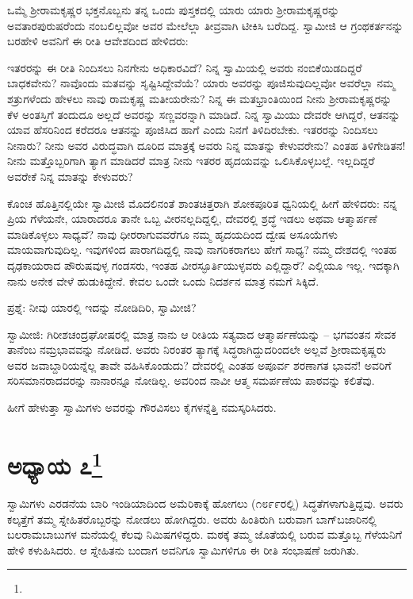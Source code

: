 ಒಮ್ಮೆ ಶ‍್ರೀರಾಮಕೃಷ್ಣರ ಭಕ್ತನೊಬ್ಬನು ತನ್ನ ಒಂದು ಪುಸ್ತಕದಲ್ಲಿ ಯಾರು ಯಾರು ಶ‍್ರೀರಾಮಕೃಷ್ಣರನ್ನು ಅವತಾರಪುರುಷರೆಂದು ನಂಬಲಿಲ್ಲವೋ ಅವರ ಮೇಲೆಲ್ಲಾ ತೀವ್ರವಾಗಿ ಟೀಕಿಸಿ ಬರೆದಿದ್ದ. ಸ್ವಾಮೀಜಿ ಆ ಗ್ರಂಥಕರ್ತನನ್ನು ಬರಹೇಳಿ ಅವನಿಗೆ ಈ ರೀತಿ ಆವೇಶದಿಂದ ಹೇಳಿದರು:

ಇತರರನ್ನು ಈ ರೀತಿ ನಿಂದಿಸಲು ನಿನಗೇನು ಅಧಿಕಾರವಿದೆ? ನಿನ್ನ ಸ್ವಾಮಿಯಲ್ಲಿ ಅವರು ನಂಬಿಕೆಯಿಡದಿದ್ದರೆ ಬಾಧಕವೇನು? ನಾವೊಂದು ಮತವನ್ನು ಸೃಷ್ಟಿಸಿದ್ದೇವೆಯೆ? ಯಾರು ಅವರನ್ನು ಪೂಜಿಸುವುದಿಲ್ಲವೋ ಅವರೆಲ್ಲಾ ನಮ್ಮ ಶತ್ರುಗಳೆಂದು ಹೇಳಲು ನಾವು ರಾಮಕೃಷ್ಣ ಮತೀಯರೇನು? ನಿನ್ನ ಈ ಮತಭ್ರಾಂತಿಯಿಂದ ನೀನು ಶ‍್ರೀರಾಮಕೃಷ್ಣರನ್ನು ಕೆಳ ಅಂತಸ್ತಿಗೆ ತಂದುದೂ ಅಲ್ಲದೆ ಅವರನ್ನು ಸಣ್ಣವರನ್ನಾಗಿ ಮಾಡಿದೆ. ನಿನ್ನ ಸ್ವಾಮಿಯು ದೇವರೇ ಆಗಿದ್ದರೆ, ಆತನನ್ನು ಯಾವ ಹೆಸರಿನಿಂದ ಕರೆದರೂ ಆತನನ್ನು ಪೂಜಿಸಿದ ಹಾಗೆ ಎಂದು ನಿನಗೆ ತಿಳಿದಿರಬೇಕು. ಇತರರನ್ನು ನಿಂದಿಸಲು ನೀನಾರು? ನೀನು ಅವರ ವಿರುದ್ಧವಾಗಿ ದೂರಿದ ಮಾತ್ರಕ್ಕೆ ಅವರು ನಿನ್ನ ಮಾತನ್ನು ಕೇಳುವರೇನು? ಎಂತಹ ತಿಳಿಗೇಡಿತನ! ನೀನು ಮತ್ತೊಬ್ಬರಿಗಾಗಿ ತ್ಯಾಗ ಮಾಡಿದರೆ ಮಾತ್ರ ನೀನು ಇತರರ ಹೃದಯವನ್ನು ಒಲಿಸಿಕೊಳ್ಳಬಲ್ಲೆ. ಇಲ್ಲದಿದ್ದರೆ ಅವರೇಕೆ ನಿನ್ನ ಮಾತನ್ನು ಕೇಳುವರು?

ಕೊಂಚ ಹೊತ್ತಿನಲ್ಲಿಯೇ ಸ್ವಾಮೀಜಿ ಮೊದಲಿನಂತೆ ಶಾಂತಚಿತ್ತರಾಗಿ ಶೋಕಪೂರಿತ ಧ್ವನಿಯಲ್ಲಿ ಹೀಗೆ ಹೇಳಿದರು: ನನ್ನ ಪ್ರಿಯ ಗೆಳೆಯನೇ, ಯಾರಾದರೂ ತಾನೇ ಒಬ್ಬ ವೀರನಲ್ಲದಿದ್ದಲ್ಲಿ, ದೇವರಲ್ಲಿ ಶ್ರದ್ಧೆ ಇಡಲು ಅಥವಾ ಆತ್ಮಾರ್ಪಣೆ ಮಾಡಿಕೊಳ್ಳಲು ಸಾಧ್ಯವೆ? ನಾವು ಧೀರರಾಗುವವರೆಗೂ ನಮ್ಮ ಹೃದಯದಿಂದ ದ್ವೇಷ ಅಸೂಯೆಗಳು ಮಾಯವಾಗುವುದಿಲ್ಲ. ಇವುಗಳಿಂದ ಪಾರಾಗದಿದ್ದಲ್ಲಿ ನಾವು ನಾಗರಿಕರಾಗಲು ಹೇಗೆ ಸಾಧ್ಯ? ನಮ್ಮ ದೇಶದಲ್ಲಿ ಇಂತಹ ದೃಢಕಾಯರಾದ ಪೌರುಷವುಳ್ಳ ಗಂಡಸರು, ಇಂತಹ ವೀರಸ್ಫೂರ್ತಿಯುಳ್ಳವರು ಎಲ್ಲಿದ್ದಾರೆ? ಎಲ್ಲಿಯೂ ಇಲ್ಲ. ಇದಕ್ಕಾಗಿ ನಾನು ಅನೇಕ ವೇಳೆ ಹುಡುಕಿದ್ದೇನೆ. ಕೇವಲ ಒಂದೇ ಒಂದು ನಿದರ್ಶನ ಮಾತ್ರ ನಮಗೆ ಸಿಕ್ಕಿದೆ.

ಪ್ರಶ್ನೆ: ನೀವು ಯಾರಲ್ಲಿ ಇದನ್ನು ನೋಡಿದಿರಿ, ಸ್ವಾಮೀಜಿ?

ಸ್ವಾಮೀಜಿ: ಗಿರೀಶಚಂದ್ರಘೋಷರಲ್ಲಿ ಮಾತ್ರ ನಾನು ಆ ರೀತಿಯ ಸತ್ಯವಾದ ಆತ್ಮಾರ್ಪಣೆಯನ್ನು – ಭಗವಂತನ ಸೇವಕ ತಾನೆಂಬ ನಮ್ರಭಾವವನ್ನು ನೋಡಿದೆ. ಅವರು ನಿರಂತರ ತ್ಯಾಗಕ್ಕೆ ಸಿದ್ಧರಾಗಿದ್ದುದರಿಂದಲೇ ಅಲ್ಲವೆ ಶ‍್ರೀರಾಮಕೃಷ್ಣರು ಅವರ ಜವಾಬ್ದಾರಿಯನ್ನೆಲ್ಲ ತಾವೇ ವಹಿಸಿಕೊಂಡುದು? ದೇವರಲ್ಲಿ ಎಂತಹ ಅಪೂರ್ವ ಶರಣಾಗತ ಭಾವನೆ! ಅವರಿಗೆ ಸರಿಸಮಾನರಾದವರನ್ನು ನಾನಾರನ್ನೂ ನೋಡಿಲ್ಲ. ಅವರಿಂದ ನಾವೀ ಆತ್ಮ ಸಮರ್ಪಣೆಯ ಪಾಠವನ್ನು ಕಲಿತೆವು.

ಹೀಗೆ ಹೇಳುತ್ತಾ ಸ್ವಾಮಿಗಳು ಅವರನ್ನು ಗೌರವಿಸಲು ಕೈಗಳನ್ನೆತ್ತಿ ನಮಸ್ಕರಿಸಿದರು.

\chapter{ಅಧ್ಯಾಯ ೭\protect\footnote{}}

ಸ್ವಾಮಿಗಳು ಎರಡನೆಯ ಬಾರಿ ಇಂಡಿಯಾದಿಂದ ಅಮೆರಿಕಾಕ್ಕೆ ಹೋಗಲು (೧೮೯೯ರಲ್ಲಿ) ಸಿದ್ಧತೆಗಳಾಗುತ್ತಿದ್ದವು. ಅವರು ಕಲ್ಕತ್ತೆಗೆ ತಮ್ಮ ಸ್ನೇಹಿತರೊಬ್ಬರನ್ನು ನೋಡಲು ಹೋಗಿದ್ದರು. ಅವರು ಹಿಂತಿರುಗಿ ಬರುವಾಗ ಬಾಗ್‌ಬಜಾರಿನಲ್ಲಿ ಬಲರಾಮಬಾಬುಗಳ ಮನೆಯಲ್ಲಿ ಕೆಲವು ನಿಮಿಷಗಳಿದ್ದರು. ಮಠಕ್ಕೆ ತಮ್ಮ ಜೊತೆಯಲ್ಲಿ ಬರುವ ಮತ್ತೊಬ್ಬ ಗೆಳೆಯನಿಗೆ ಹೇಳಿ ಕಳುಹಿಸಿದರು. ಆ ಸ್ನೇಹಿತನು ಬಂದಾಗ ಅವನಿಗೂ ಸ್ವಾಮಿಗಳಿಗೂ ಈ ರೀತಿ ಸಂಭಾಷಣೆ ಜರುಗಿತು.

